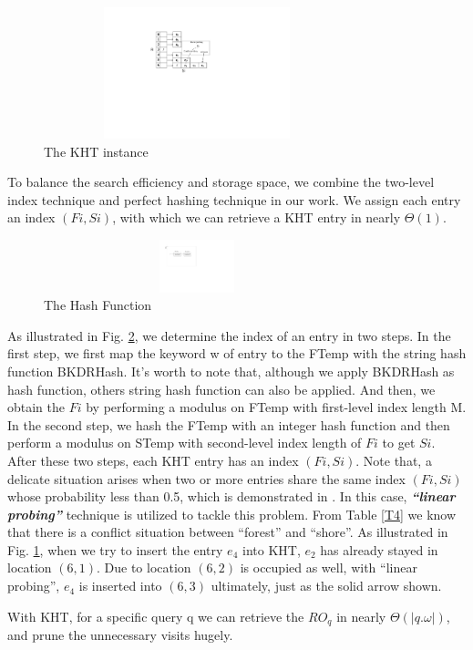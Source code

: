\begin{figure}
\centering
\includegraphics[width=3.5in,height=1.5in]{KHT}
\caption{The KHT instance} \label{F1}
\end{figure}

To balance the search efficiency and storage space, we combine the two-level index technique and perfect hashing technique \cite{cormen2001introduction} in our work. We assign each entry an index $(Fi,Si)$, with which we can retrieve a KHT entry in nearly $\Theta(1)$.

\begin{figure}
\centering
\includegraphics[width=3.5in,height=0.6in]{HASH}
\caption{The Hash Function} \label{F20}
\end{figure}

As illustrated in Fig. \ref{F20}, we determine the index of an entry in two steps. In the first step, we first map the keyword w of entry to the FTemp with the string hash function BKDRHash. It's worth to note that, although we apply BKDRHash as hash function, others string hash function can also be applied. And then, we obtain the $Fi$ by performing a modulus on FTemp with first-level index length M. In the second step, we hash the FTemp with an integer hash function and then perform a modulus on STemp with second-level index length of $Fi$ to get $Si$. After these two steps, each KHT entry has an index $(Fi,Si)$. Note that, a delicate situation arises when two or more entries share the same index $(Fi,Si)$ whose probability less than 0.5, which is demonstrated in \cite{cormen2001introduction}. In this case, \textbf{\textit{``linear probing''}} technique is utilized to tackle this problem. From Table \ref{T4} we know that there is a conflict situation between ``forest'' and ``shore''. As illustrated in Fig. \ref{F1}, when we try to insert the entry $e_4$ into KHT, $e_2$ has already stayed in location $(6,1)$. Due to location $(6,2)$ is occupied as well, with ``linear probing'', $e_4$ is inserted into $(6,3)$ ultimately, just as the solid arrow shown.

With KHT, for a specific query q we can retrieve the $RO_q$ in nearly $\Theta(|q.\omega|)$, and prune the unnecessary visits hugely.








